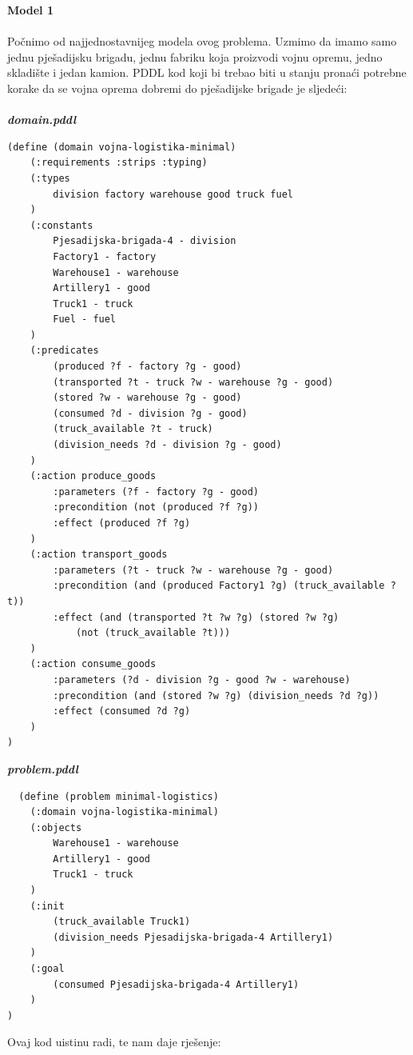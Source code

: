 \documentclass{article}
\begin{document}
\Large
\noindent
\textbf{Model 1}
\\~\\
\normalsize 
Počnimo od najjednostavnijeg modela ovog problema. Uzmimo da imamo samo jednu pješadijsku brigadu, jednu fabriku koja proizvodi vojnu opremu, jedno skladište i jedan kamion. PDDL kod koji bi trebao biti u stanju pronaći potrebne korake da se vojna oprema dobremi do pješadijske brigade je sljedeći:
\\~\\
\textbf{\textit{domain.pddl}}
\begin{verbatim}
(define (domain vojna-logistika-minimal)
    (:requirements :strips :typing)
    (:types
        division factory warehouse good truck fuel
    )
    (:constants
        Pjesadijska-brigada-4 - division
        Factory1 - factory
        Warehouse1 - warehouse
        Artillery1 - good
        Truck1 - truck
        Fuel - fuel
    )
    (:predicates
        (produced ?f - factory ?g - good)
        (transported ?t - truck ?w - warehouse ?g - good)
        (stored ?w - warehouse ?g - good)
        (consumed ?d - division ?g - good)
        (truck_available ?t - truck)
        (division_needs ?d - division ?g - good)
    )
    (:action produce_goods
        :parameters (?f - factory ?g - good)
        :precondition (not (produced ?f ?g))
        :effect (produced ?f ?g)
    )
    (:action transport_goods
        :parameters (?t - truck ?w - warehouse ?g - good)
        :precondition (and (produced Factory1 ?g) (truck_available ?t))
        :effect (and (transported ?t ?w ?g) (stored ?w ?g) 
            (not (truck_available ?t)))
    )
    (:action consume_goods
        :parameters (?d - division ?g - good ?w - warehouse)
        :precondition (and (stored ?w ?g) (division_needs ?d ?g))
        :effect (consumed ?d ?g)
    )
)

\end{verbatim}
\textbf{\textit{problem.pddl}}
\begin{verbatim}
  (define (problem minimal-logistics)
    (:domain vojna-logistika-minimal)
    (:objects
        Warehouse1 - warehouse
        Artillery1 - good
        Truck1 - truck
    )
    (:init
        (truck_available Truck1)
        (division_needs Pjesadijska-brigada-4 Artillery1)
    )
    (:goal
        (consumed Pjesadijska-brigada-4 Artillery1)
    )
)
\end{verbatim}
Ovaj kod uistinu radi, te nam daje rješenje:\\
\begin{figure}[H] 
  \noindent{}
\end{figure}
\end{document}
